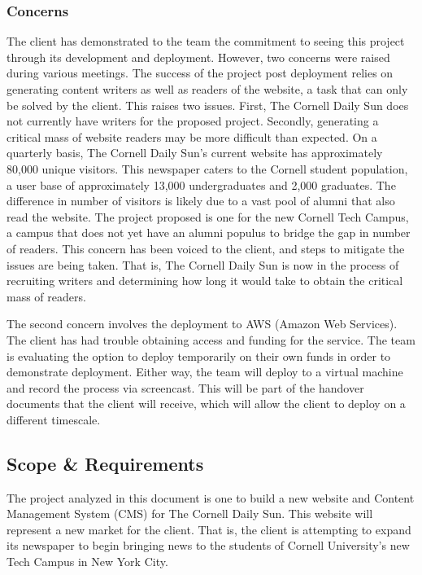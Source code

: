 \documentclass[10pt]{article} %
\begin{document}
\subsubsection{Concerns}

The client has demonstrated to the team the commitment to seeing this project through its development and deployment. However, two concerns were raised during various meetings. The success of the project post deployment relies on generating content writers as well as readers of the website, a task that can only be solved by the client. This raises two issues. First, The Cornell Daily Sun does not currently have writers for the proposed project. Secondly, generating a critical mass of website readers may be more difficult than expected. On a quarterly basis, The Cornell Daily Sun’s current website has approximately 80,000 unique visitors. This newspaper caters to the Cornell student population, a user base of approximately 13,000 undergraduates and 2,000 graduates. The difference in number of visitors is likely due to a vast pool of alumni that also read the website. The project proposed is one for the new Cornell Tech Campus, a campus that does not yet have an alumni populus to bridge the gap in number of readers. This concern has been voiced to the client, and steps to mitigate the issues are being taken. That is, The Cornell Daily Sun is now in the process of recruiting writers and determining how long it would take to obtain the critical mass of readers.

The second concern involves the deployment to AWS (Amazon Web Services). The client has had trouble obtaining access and funding for the service. The team is evaluating the option to deploy temporarily on their own funds in order to demonstrate deployment. Either way, the team will deploy to a virtual machine and record the process via screencast. This will be part of the handover documents that the client will receive, which will allow the client to deploy on a different timescale.

\subsection{Scope \& Requirements}

The project analyzed in this document is one to build a new website and Content Management System (CMS) for The Cornell Daily Sun. This website will represent a new market for the client. That is, the client is attempting to expand its newspaper to begin bringing news to the students of Cornell University’s new Tech Campus in New York City.
                   
\end{document}
